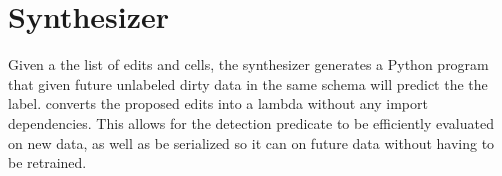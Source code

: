\section{Synthesizer}
Given a the list of edits and cells, the synthesizer generates a Python program that given future unlabeled dirty data in the same schema will predict the the label. \sys converts the proposed edits into a lambda without any import dependencies. This allows for the detection predicate to be efficiently evaluated on new data, as well as be serialized so it can on future data without having to be retrained.
